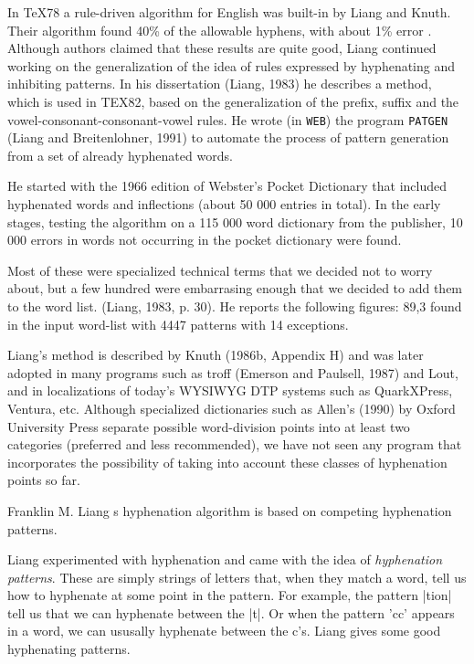 {In \TeX78 a rule-driven algorithm for English   
was built-in by Liang and Knuth. Their algorithm
found 40\% of the allowable hyphens, with
about 1\% error \cite{Liang1981}. Although authors
claimed that these results are quite good, Liang
continued working on the generalization of the idea
of rules expressed by hyphenating and inhibiting
patterns. In his dissertation (Liang, 1983) he describes
a method, which is used in TEX82, based
on the generalization of the prefix, suffix and the
vowel-consonant-consonant-vowel rules. He wrote
(in \texttt{WEB}) the program \texttt{PATGEN} (Liang and Breitenlohner,
1991) to automate the process of pattern 
generation from a set of already hyphenated words.

He started with the 1966 edition of Webster's Pocket\cite{websters1961}
Dictionary that included hyphenated words and inflections
 (about 50 000 entries in total). In the early
stages, testing the algorithm on a 115 000 word dictionary
from the publisher, 10 000 errors in words
not occurring in the pocket dictionary were found.

Most of these were specialized technical terms that
we decided not to worry about, but a few hundred
were embarrasing enough that we decided to add
them to the word list. (Liang, 1983, p. 30). He
reports the following figures: 89,3%
found in the input word-list with 4447 patterns
with 14 exceptions.

Liang's method is described by Knuth (1986b,
Appendix H) and was later adopted in many programs
such as troff (Emerson and Paulsell, 1987)
and Lout, and in localizations of today's WYSIWYG
DTP systems such as QuarkXPress, Ventura,
etc. Although specialized dictionaries such
as Allen's (1990) by Oxford University Press separate
possible word-division points into at least two
categories (preferred and less recommended), we
have not seen any program that incorporates the
possibility of taking into account these classes of
hyphenation points so far.




Franklin M. Liang s hyphenation algorithm is based
on competing hyphenation patterns. 

Liang experimented with hyphenation and came with the idea of \textit{hyphenation patterns}.
These are simply strings of letters that, when they match a word, tell us how to hyphenate at some point in the pattern.
For example, the pattern |tion| tell us that we can hyphenate between the |t|. Or when the pattern 'cc' appears in a word, we can ususally hyphenate between the c's. Liang gives some good hyphenating patterns\cite{Liang1981}.

}
